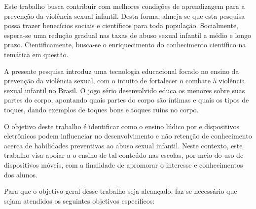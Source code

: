 Este trabalho busca contribuir com melhores condições de aprendizagem para a prevenção da violência sexual infantil. Desta forma, almeja-se que esta pesquisa possa trazer benecícios sociais e científicos para toda população. Socialmente, espera-se uma redução gradual nas taxas de abuso sexual infantil a médio e longo prazo. Cientificamente, busca-se o enriquecimento do conhecimento científico na temática em questão. 

A presente pesquisa introduz uma tecnologia educacional focado no ensino da prevenção da violência sexual, com o intuito de fortalecer o combate à violência sexual infantil no Brasil. O jogo sério desenvolvido educa os menores sobre suas partes do corpo, apontando quais partes do corpo são íntimas e quais os tipos de toques, dando exemplos de toques bons e toques ruins no corpo. 


O objetivo deste trabalho é identificar como o ensino lúdico por e dispositivos eletrônicos podem influenciar no desenvolvimento e não retenção de conhecimento acerca de habilidades preventivas ao abuso sexual infantil. Neste contexto, este trabalho visa apoiar a o ensino de tal conteúdo nas escolas, por meio do uso de dispositivos móveis, com a finalidade de apromorar o interesse e conhecimentos dos alunos.






Para que o objetivo geral desse trabalho seja alcançado, faz-se necessário que sejam atendidos os seguintes objetivos específicos: 

